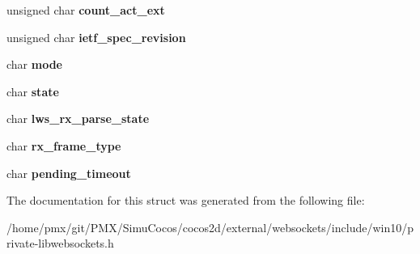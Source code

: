 \begin{DoxyCompactItemize}
\item 
\mbox{\label{structlws_a82eff961ea8b30acaff9fb42606a93d7}} 
unsigned char {\bfseries count\+\_\+act\+\_\+ext}
\item 
\mbox{\label{structlws_a51ab1967f438402c92152a61f52fa8a0}} 
unsigned char {\bfseries ietf\+\_\+spec\+\_\+revision}
\item 
\mbox{\label{structlws_acbc2185d9ac77a500d4992c01459bd9b}} 
char {\bfseries mode}
\item 
\mbox{\label{structlws_a7d2f30b9f79a9ac70ddd870eccd3372a}} 
char {\bfseries state}
\item 
\mbox{\label{structlws_ad7ca4198d69113a48c2058a721ea6d94}} 
char {\bfseries lws\+\_\+rx\+\_\+parse\+\_\+state}
\item 
\mbox{\label{structlws_a8515711f920ac032a83e826bc889db51}} 
char {\bfseries rx\+\_\+frame\+\_\+type}
\item 
\mbox{\label{structlws_a739fcec3ded223b4ec1b02e156b4a496}} 
char {\bfseries pending\+\_\+timeout}
\end{DoxyCompactItemize}


The documentation for this struct was generated from the following file\+:\begin{DoxyCompactItemize}
\item 
/home/pmx/git/\+P\+M\+X/\+Simu\+Cocos/cocos2d/external/websockets/include/win10/private-\/libwebsockets.\+h\end{DoxyCompactItemize}
